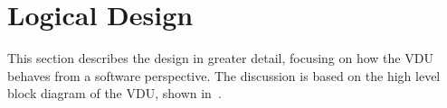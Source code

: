 




\section{Logical Design}

This section describes the design in greater detail, focusing on how the VDU
behaves from a software perspective. The discussion is based on the high level
block diagram of the VDU, shown in~.

